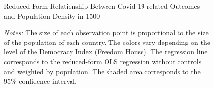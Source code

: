 \begin{figure}[!htbp]
\centering
\caption{Reduced Form Relationship Between Covid-19-related Outcomes and Population Density in 1500}
\centering
\label{fig:reduced-form-lpd}
  \caption*{\textit{Notes:} The size of each observation point is proportional to the size of the population of each country. The colors vary depending on the level of the Democracy Index (Freedom House). The regression line corresponds to the reduced-form OLS regression without controls and weighted by population. The shaded area corresponds to the 95\% confidence interval.}
  
\end{figure}